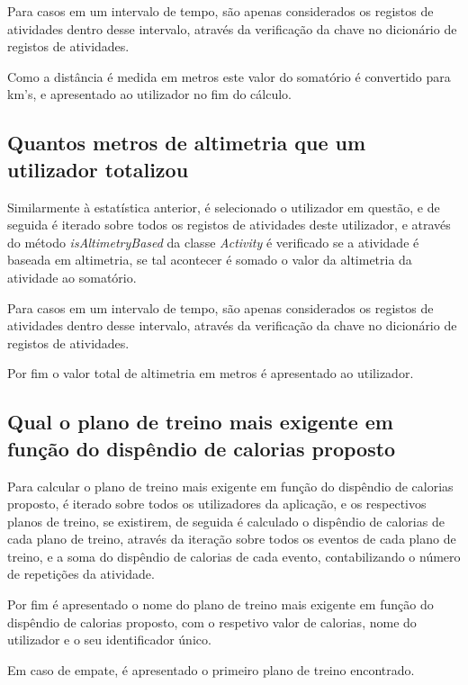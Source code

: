 \documentclass[a4paper,12pt]{scrreprt}
\begin{document}
        Para casos em um intervalo de tempo, são apenas considerados os registos de atividades dentro desse intervalo,
        através da verificação da chave no dicionário de registos de atividades.

        Como a distância é medida em metros este valor do somatório é convertido para km's,
        e apresentado ao utilizador no fim do cálculo.

    \subsection{Quantos metros de altimetria que um utilizador totalizou}
        Similarmente à estatística anterior, é selecionado o utilizador em questão,
        e de seguida é iterado sobre todos os registos de atividades deste utilizador,
        e através do método \textit{isAltimetryBased} da classe \textit{Activity} é
        verificado se a atividade é baseada em altimetria, se tal acontecer é somado o valor da altimetria da atividade ao somatório.

        Para casos em um intervalo de tempo, são apenas considerados os registos de atividades dentro desse intervalo,
        através da verificação da chave no dicionário de registos de atividades.

        Por fim o valor total de altimetria em metros é apresentado ao utilizador.

    \subsection{Qual o plano de treino mais exigente em função do dispêndio de calorias proposto}
        Para calcular o plano de treino mais exigente em função do dispêndio de calorias proposto,
        é iterado sobre todos os utilizadores da aplicação,
        e os respectivos planos de treino, se existirem,
        de seguida é calculado o dispêndio de calorias de cada plano de treino,
        através da iteração sobre todos os eventos de cada plano de treino,
        e a soma do dispêndio de calorias de cada evento,
        contabilizando o número de repetições da atividade.

        Por fim é apresentado o nome do plano de treino mais exigente em função do dispêndio de calorias proposto,
        com o respetivo valor de calorias, nome do utilizador e o seu identificador único.

        Em caso de empate, é apresentado o primeiro plano de treino encontrado.
\end{document}
